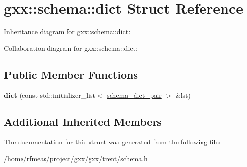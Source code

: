 \hypertarget{structgxx_1_1schema_1_1dict}{}\section{gxx\+:\+:schema\+:\+:dict Struct Reference}
\label{structgxx_1_1schema_1_1dict}


Inheritance diagram for gxx\+:\+:schema\+:\+:dict\+:


Collaboration diagram for gxx\+:\+:schema\+:\+:dict\+:
\subsection*{Public Member Functions}
\begin{DoxyCompactItemize}
\item 
{\bfseries dict} (const std\+::initializer\+\_\+list$<$ \hyperlink{structgxx_1_1schema_1_1schema__dict__pair}{schema\+\_\+dict\+\_\+pair} $>$ \&lst)\hypertarget{structgxx_1_1schema_1_1dict_adde30152a288ea3a1f60426caa50f27b}{}\label{structgxx_1_1schema_1_1dict_adde30152a288ea3a1f60426caa50f27b}

\end{DoxyCompactItemize}
\subsection*{Additional Inherited Members}


The documentation for this struct was generated from the following file\+:\begin{DoxyCompactItemize}
\item 
/home/rfmeas/project/gxx/gxx/trent/schema.\+h\end{DoxyCompactItemize}
